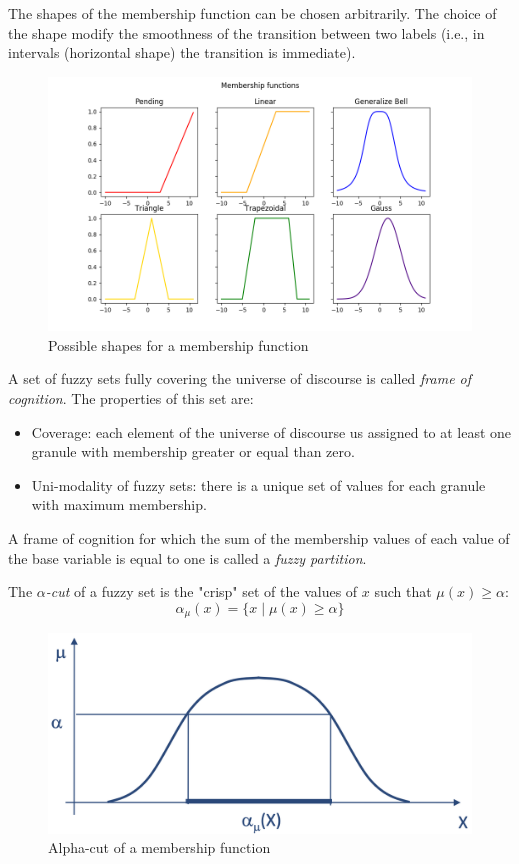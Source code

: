 \documentclass[12pt, a4paper]{report}
\newtheorem[L]{theorem}{Theorem}
\newtheorem[M]{corollary}{Corollary}
\newtheorem[M]{lemma}{Lemma}
\newtheorem[style=S,bodystyle=\normalfont]{definition}{Definition}
\begin{document}
    The shapes of the membership function can be chosen arbitrarily. The choice of the shape modify the smoothness of the transition 
    between two labels (i.e., in intervals (horizontal shape) the transition is immediate). 
    \begin{figure}[H]
        \centering
        \includegraphics[width=0.75\linewidth]{images/shape.png}
        \caption{Possible shapes for a membership function}
    \end{figure}
    \begin{definition}
        A set of fuzzy sets fully covering the universe of discourse is called \emph{frame of cognition}. The properties of this set are:
        \begin{itemize}
            \item Coverage: each element of the universe of discourse us assigned to at least one granule with membership greater or equal 
                than zero.
            \item Uni-modality of fuzzy sets: there is a unique set of values for each granule with maximum membership. 
        \end{itemize}
    \end{definition}
    \begin{definition}
        A frame of cognition for which the sum  of the membership values of each value of the base variable is equal to one is called 
        a \emph{fuzzy partition}. 
    \end{definition}
    \begin{definition}
        The \emph{$\alpha$-cut} of a fuzzy set is the "crisp" set of the values of $x$ such that $\mu(x) \geq \alpha$:
        \[\alpha_\mu(x)=\{x \mid \mu(x) \geq \alpha\}\]
    \end{definition}
    \begin{figure}[H]
        \centering
        \includegraphics[width=0.5\linewidth]{images/alpha.png}
        \caption{Alpha-cut of a membership function}
    \end{figure}
\end{document}
